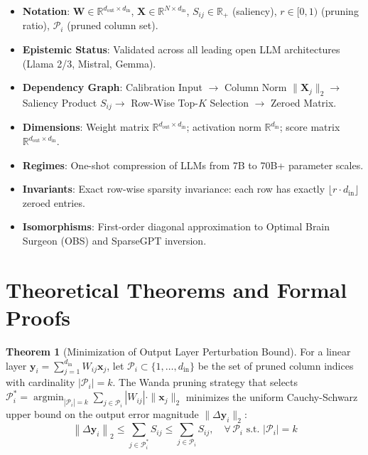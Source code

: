 \documentclass[11pt,a4paper]{article}
\theoremstyle{definition}
\newtheorem{theorem}{\textbf{Theorem}}[section]
\begin{document}
\begin{itemize}
    \item \textbf{Notation}: $\mathbf{W} \in \mathbb{R}^{d_{\text{out}} \times d_{\text{in}}}$, $\mathbf{X} \in \mathbb{R}^{N \times d_{\text{in}}}$, $S_{ij} \in \mathbb{R}_+$ (saliency), $r \in [0, 1)$ (pruning ratio), $\mathcal{P}_i$ (pruned column set).
    \item \textbf{Epistemic Status}: Validated across all leading open LLM architectures (Llama 2/3, Mistral, Gemma).
    \item \textbf{Dependency Graph}: Calibration Input $\to$ Column Norm $\|\mathbf{X}_j\|_2 \to$ Saliency Product $S_{ij} \to$ Row-Wise Top-$K$ Selection $\to$ Zeroed Matrix.
    \item \textbf{Dimensions}: Weight matrix $\mathbb{R}^{d_{\text{out}} \times d_{\text{in}}}$; activation norm $\mathbb{R}^{d_{\text{in}}}$; score matrix $\mathbb{R}^{d_{\text{out}} \times d_{\text{in}}}$.
    \item \textbf{Regimes}: One-shot compression of LLMs from 7B to 70B+ parameter scales.
    \item \textbf{Invariants}: Exact row-wise sparsity invariance: each row has exactly $\lfloor r \cdot d_{\text{in}} \rfloor$ zeroed entries.
    \item \textbf{Isomorphisms}: First-order diagonal approximation to Optimal Brain Surgeon (OBS) and SparseGPT inversion.
\end{itemize}

\section{Theoretical Theorems and Formal Proofs}

\begin{theorem}[Minimization of Output Layer Perturbation Bound]
For a linear layer $\mathbf{y}_i = \sum_{j=1}^{d_{\text{in}}} W_{ij} \mathbf{x}_j$, let $\mathcal{P}_i \subset \{1, \dots, d_{\text{in}}\}$ be the set of pruned column indices with cardinality $|\mathcal{P}_i| = k$. The Wanda pruning strategy that selects $\mathcal{P}_i^* = \operatorname{argmin}_{|\mathcal{P}_i|=k} \sum_{j \in \mathcal{P}_i} |W_{ij}| \cdot \|\mathbf{x}_j\|_2$ minimizes the uniform Cauchy-Schwarz upper bound on the output error magnitude $\|\Delta \mathbf{y}_i\|_2$:
{\boldmath
\begin{equation}
\left\| \Delta \mathbf{y}_i \right\|_2 \le \sum_{j \in \mathcal{P}_i^*} S_{ij} \le \sum_{j \in \mathcal{P}_i} S_{ij}, \quad \forall \, \mathcal{P}_i \text{ s.t. } |\mathcal{P}_i| = k
\end{equation}
}
\end{theorem}
\end{document}
